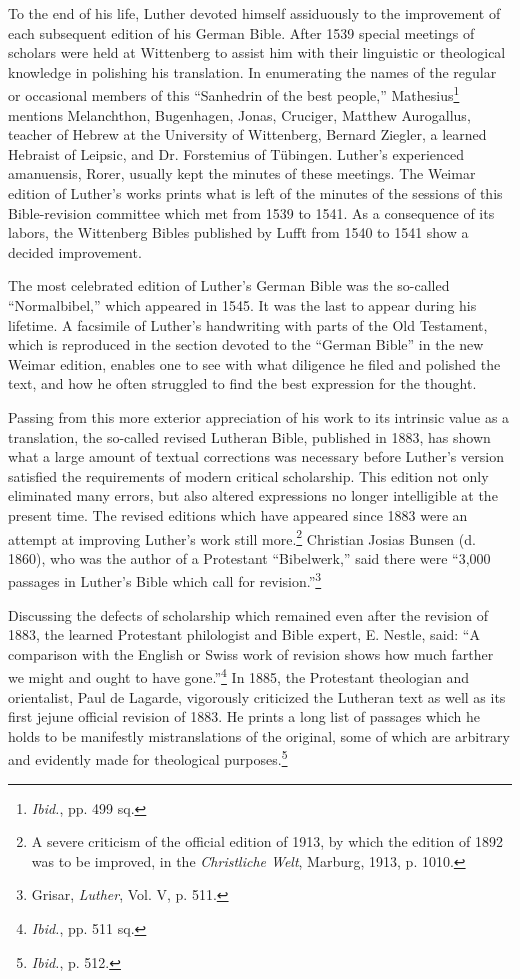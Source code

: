 To the end of his life, Luther devoted himself assiduously to the improvement
of each subsequent edition of his German Bible. After 1539 special
meetings of scholars were held at Wittenberg to assist him with their
linguistic or theological knowledge in polishing his translation. In enumerating
the names of the regular or occasional members of this “Sanhedrin of the best
people,” Mathesius\footnote{\textit{Ibid.}, pp. 499 sq.}
 mentions Melanchthon, Bugenhagen, Jonas, Cruciger,
Matthew Aurogallus, teacher of Hebrew at the University of Wittenberg,
Bernard Ziegler, a learned Hebraist of Leipsic, and Dr. Forstemius of Tübingen.
Luther’s experienced amanuensis, Rorer, usually kept the minutes of these
meetings. The Weimar edition of Luther’s works prints what is left of the
minutes of the sessions of this Bible-revision committee which met from 1539
to 1541. As a consequence of its labors, the Wittenberg Bibles published by
Lufft from 1540 to 1541 show a decided improvement.

The most celebrated edition of Luther’s German Bible was the so-called
“Normalbibel,” which appeared in 1545. It was the last to
appear during his lifetime. A facsimile of Luther’s handwriting
with parts of the Old Testament, which is reproduced in the section devoted
to the “German Bible” in the new Weimar edition,
enables one to see with what diligence he filed and polished the text,
and how he often struggled to find the best expression for the thought.

Passing from this more exterior appreciation of his work to its
intrinsic value as a translation, the so-called revised Lutheran Bible,
published in 1883, has shown what a large amount of textual corrections
was necessary before Luther’s version satisfied the requirements
of modern critical scholarship. This edition not only eliminated many
errors, but also altered expressions no longer intelligible at the present
time. The revised editions which have appeared since 1883 were an
attempt at improving Luther’s work still more.\footnote
{A severe criticism of the official edition of 1913, by which the edition of 1892 was to
be improved, in the \textit{Christliche Welt}, Marburg, 1913, p. 1010.}
Christian Josias
Bunsen (d. 1860), who was the author of a Protestant “Bibelwerk,”
said there were ``3,000 passages in Luther’s Bible which call for revision.”\footnote{Grisar, \textit{Luther}, Vol. V, p. 511.}

Discussing the defects of scholarship which remained even
after the revision of 1883, the learned Protestant philologist and
Bible expert, E. Nestle, said: “A comparison with the English or
Swiss work of revision shows how much farther we might and ought
to have gone.”\footnote{\textit{Ibid.}, pp. 511 sq.}
 In 1885, the Protestant theologian and orientalist,
Paul de Lagarde, vigorously criticized the Lutheran text as well as
its first jejune official revision of 1883. He prints a long list of passages
which he holds to be manifestly mistranslations of the original,
some of which are arbitrary and evidently made for theological purposes.\footnote{\textit{Ibid.}, p. 512.}

